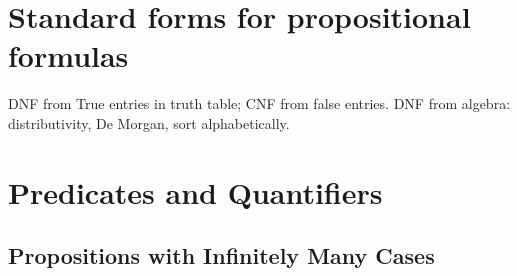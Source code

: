 \begin{problems}
\classproblems
{}

\homeworkproblems
{}

\end{problems}

\section{Standard forms for propositional formulas}
\begin{editingnotes}
DNF from True entries in truth table; CNF from false entries.   DNF from
algebra: distributivity, De Morgan, sort alphabetically.
\end{editingnotes}

\section{Predicates and Quantifiers}\label{pred_sec}

\subsection{Propositions with Infinitely Many Cases}

